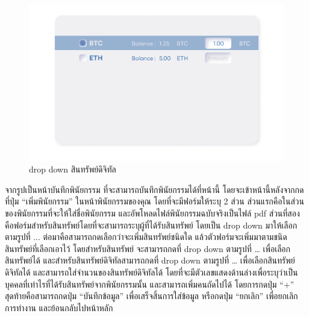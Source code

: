 \documentclass[12pt,oneside,openright,a4paper]{cpe-thai-project}
\begin{document}
		\FloatBarrier
		\begin{figure}[!thb]
			\centering
			\includegraphics[scale=0.25]{dropdown3}
			\caption{drop down สินทรัพย์ดิจิทัล}
		\end{figure}
		\FloatBarrier
		\tab จากรูปเป็นหน้าบันทึกพินัยกรรม ที่จะสามารถบันทึกพินัยกรรมได้ที่หน้านี้ โดยจะเข้าหน้านี้หลังจากกดที่ปุ่ม “เพิ่มพินัยกรรม” ในหน้าพินัยกรรมของคุณ โดยที่จะมีฟอร์มให้ระบุ 2 ส่วน ส่วนแรกคือในส่วนของพินัยกรรมที่จะให้ใส่ชื่อพินัยกรรม และอัพโหลดไฟล์พินัยกรรมฉบับจริงเป็นไฟล์ pdf ส่วนที่สองคือฟอร์มสำหรับสินทรัพย์โดยที่จะสามารถระบุผู้ที่ได้รับสินทรัพย์ โดยเป็น drop down มาให้เลือก ตามรูปที่ ... ต่อมาคือสามารถกดเลือกว่าจะเพิ่มสินทรัพย์ชนิดใด แล้วตัวฟอร์มจะเพิ่มมาตามชนิดสินทรัพย์ที่เลือกเอาไว้ โดยสำหรับสินทรัพย์ จะสามารถกดที่ drop down ตามรูปที่ … เพื่อเลือกสินทรัพย์ได้ และสำหรับสินทรัพย์ดิจิทัลสามารถกดที่ drop down ตามรูปที่ … เพื่อเลือกสินทรัพย์ดิจิทัลได้ และสามารถใส่จำนวนของสินทรัพย์ดิจิทัลได้  โดยที่จะมีตัวเลขแสดงด้านล่างเพื่อระบุว่าเป็นบุคคลที่เท่าไรที่ได้รับสินทรัพย์จากพินัยกรรมนั้น และสามารถเพิ่มคนถัดไปได้ โดยการกดปุ่ม “+” สุดท้ายคือสามารถกดปุ่ม “บันทึกข้อมูล” เพื่อเสร็จสิ้นการใส่ข้อมูล หรือกดปุ่ม “ยกเลิก” เพื่อยกเลิกการทำงาน และย้อนกลับไปหน้าหลัก
\clearpage
\end{document}
